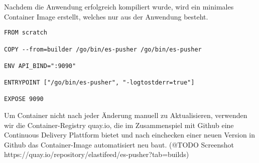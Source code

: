 Nachdem die Anwendung erfolgreich kompiliert wurde, wird ein minimales Container Image erstellt, welches nur aus der Anwendung besteht.

\begin{lstlisting}
FROM scratch

COPY --from=builder /go/bin/es-pusher /go/bin/es-pusher

ENV API_BIND=":9090"

ENTRYPOINT ["/go/bin/es-pusher", "-logtostderr=true"]

EXPOSE 9090
\end{lstlisting}

Um Container nicht nach jeder Änderung manuell zu Aktualisieren, verwenden wir die Container-Registry quay.io, die im Zusammenspiel mit Github eine Continuous Delivery Plattform bietet und nach einchecken einer neuen Version in Github das Container-Image automatisiert neu baut. (@TODO Screenshot https://quay.io/repository/elastifeed/es-pusher?tab=builds)
\endsubsubsection
\endsubsection

\endsection

